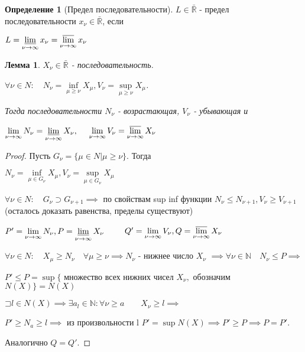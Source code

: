 \documentclass[a4paper]{article}
\newcommand\letsymbol{\mathord{\sqsupset}}
\newtheorem{lemma}{Лемма}[section]
\theoremstyle{definition}
\newtheorem*{definition}{Определение}
\theoremstyle{remark}
\begin{document}
     \begin{definition}[Предел последовательности]
          $L\in\bar{\mathbb{R}}$ - предел последовательности $x_\nu\in \bar{\mathbb{R}}$, если
          
          $L = \varliminf\limits_{\nu \to \infty}x_\nu = \varlimsup\limits_{\nu \to \infty}x_\nu$
     \end{definition}
     \begin{lemma}
          $X_\nu \in \bar{\mathbb{R}}$ - последовательность.

          $\forall \nu \in N:\quad  N_\nu = \inf\limits_{\mu \geq \nu}X_\mu, V_\nu = \sup\limits_{\mu \geq \nu}X_\mu$.

          Тогда последовательности $N_\nu$ - возрастающая, $V_\nu$ - убывающая и

          $\lim\limits_{\nu \to \infty} N_\nu = \varliminf\limits_{\nu \to \infty} X_\nu, \quad$
          $ \lim\limits_{\nu \to \infty} V_\nu = \varlimsup\limits_{\nu \to \infty} X_\nu$
     \end{lemma}
     \begin{proof}
          Пусть $G_\nu = \{\mu \in N | \mu \geq \nu\}.$ Тогда

          $N_\nu = \inf\limits_{\mu\in G_\nu}X_\mu, V_\nu = \sup\limits_{\mu\in G_\nu}X_\mu$

          $\forall \nu \in N: \quad G_\nu \supset G_{\nu+1} \implies$ по свойствам sup inf функции
          $N_\nu \leq N_{\nu+1}, V_\nu \geq V_{\nu+1} $ (осталось доказать равенства, пределы существуют)

          $P' = \lim\limits_{\nu \to \infty} N_\nu, P = \varliminf\limits_{\nu \to \infty} X_\nu\qquad$
          $Q' = \lim\limits_{\nu \to \infty} V_\nu, Q = \varlimsup\limits_{\nu \to \infty} X_\nu$

          $\forall \nu \in N: \quad X_\mu \geq N_\nu \quad \forall \mu \geq \nu \implies N_\nu$ - нижнее число $X_\nu$
          $\implies \forall \nu \in \mathbb{N} \quad N_\nu \leq P \implies$

          $P' \leq P = \sup \{$ множество всех нижних чисел $X_\nu,$ обозначим $N(X)\} = N(X)$

          $\letsymbol{} l \in N(X) \implies\exists a_l\in \mathbb{N}: \forall \nu \geq a \quad\quad X_\nu \geq l\implies$

          $P'\geq N_a\geq l\implies$ из произвольности l $P' = \sup N(X)\implies P' \geq P\implies P = P'$.

          Аналогично $Q = Q'$.
     \end{proof}
\end{document}
